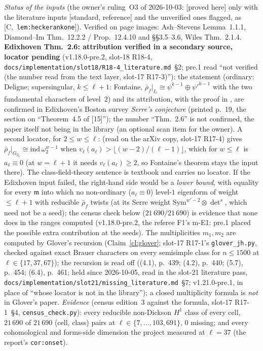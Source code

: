 \documentclass[11pt]{article}
\theoremstyle{remark}
\newcommand{\Q}{\mathbb{Q}}
\newcommand{\Sym}{\mathrm{Sym}}
\newcommand{\m}{\mathfrak{m}}
\newcommand{\HA}[1]{[C,~\texttt{#1}]}      %
\newcommand{\PROVED}{\textsf{[proved here]}}
\newcommand{\STD}{\textsf{[standard, reference]}}
\begin{document}
\emph{Status of the inputs} (the owner's ruling~O3 of 2026-10-03: \PROVED{} only with the literature inputs \STD{} and the unverified ones flagged, as
\HA{lem:heckerankone}). Verified on page images: Ash--Stevens Lemma~1.1.1, Diamond--Im Thm.~12.2.2 / Prop.~12.4.10 and \S\S3.5--3.6, Wiles Thm.~2.1.4.
\textbf{Edixhoven Thm.~2.6: attribution verified in a secondary source, locator pending} (v1.18.0-pre.2, slot-18 R18-4,
\texttt{docs/implementation/slot18/R18-4\_literature.md}~\S2; pre.1 read ``not verified (the number read from the text layer, slot-17 R17-3)''): the statement
(ordinary: Deligne; supersingular, $k\le\ell+1$: Fontaine, $\bar\rho_f|_{I_\ell}\cong\psi^{k-1}\oplus\psi'^{k-1}$ with the two fundamental characters of level~$2$) and
its attribution, with the proof in \cite{edixhoven}, are confirmed in Edixhoven's Boston survey \emph{Serre's conjecture} (printed p.~19, the section on
``Theorem~4.5 of [15]''); the number ``Thm.~2.6'' is not confirmed, the paper itself not being in the library (an optional scan item for the owner). A second
locator, for $2\le w\le\ell$: \cite[Thm.~4.5, p.~12, with Prop.~4.4(1), p.~11]{berger_li_zhu} (read on the arXiv copy, slot-17 R17-4) gives
$\bar\rho_f|_{G_{\Q_\ell}}\cong\mathrm{ind}\,\omega_2^{w-1}$ when $v_\ell(a_\ell)>\lfloor(w-2)/(\ell-1)\rfloor$, which for $w\le\ell$ is $a_\ell\equiv0$ (at $w=\ell+1$ it
needs $v_\ell(a_\ell)\ge2$, so Fontaine's theorem stays the input there). The class-field-theory sentence is textbook and carries no locator. If the
Edixhoven input failed, the right-hand side would be a \emph{lower bound}, with equality for every $\m$ into which no non-ordinary ($a_\ell\equiv0$) level-$1$
eigenform of weight $\le\ell+1$ with reducible $\bar\rho_f$ twists (at its Serre weight $\Sym^{w'-2}\otimes{\det}^{s}$, which need not be a seed); the census
check below ($21\,690/21\,690$) is evidence that none does in the ranges computed (v1.18.0-pre.2, the referee F1's m-E1: pre.1 placed the possible extra
contribution at the seeds). The multiplicities $m_1,m_2$ are computed by Glover's recursion
(Claim~\ref{cl:glover}; slot-17 R17-1's \texttt{glover\_jh.py}, checked against exact Brauer characters on every semisimple class for $n\le1500$ at
$\ell\in\{17,37,67\}$); the recursion is read off \cite{glover} ((4.1), p.~439; (4.2), p.~440; (5.7), p.~454; (6.4), p.~461; held since 2026-10-05, read in the slot-21 literature pass,
\texttt{docs/implementation/slot21/missing\_literature.md}~\S7; v1.21.0-pre.1, in place of ``whose locator is not in the library''); a closed multiplicity formula is \emph{not} in Glover's paper.
\emph{Evidence} (census edition~3 against the formula, slot-17 R17-1~\S4, \texttt{census\_check.py}): every reducible non-Dickson $H^1$ class of every cell,
$21\,690$ of $21\,690$ (cell, class) pairs at $\ell\in\{7,\dots,103,691\}$, $0$ missing; and every cohomological and forms-side dimension the project measured at
$\ell=37$ (the report's \texttt{cor:onset}).
\end{document}
